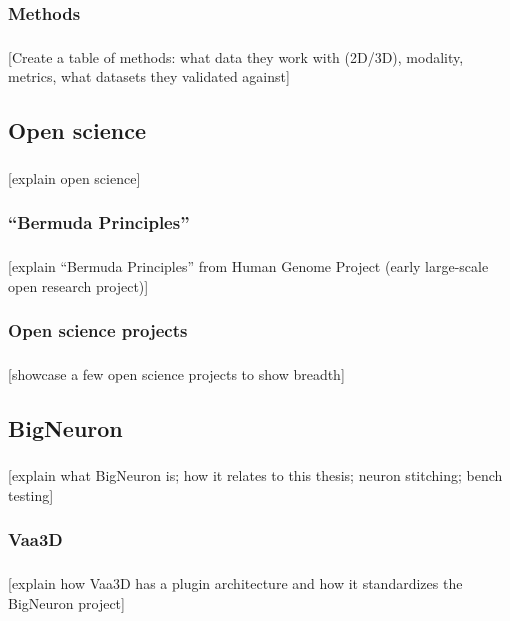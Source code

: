 \documentclass{beamer}
\newcommand{\tbackground}[1]{#1}
\newcommand{\tbackground}[1]{\textcolor{tbackground}{#1}}
\begin{document}
\subsubsection{Methods}
\begin{frame}\frametitle{\subsubsecname}
	[\tbackground{Create a table of methods: what data they work with (2D/3D), modality,
	metrics, what datasets they validated against}]
\end{frame}

\subsection{Open science}
\begin{frame}\frametitle{\subsecname}
	[\tbackground{explain open science}]
\end{frame}

\subsubsection{``Bermuda Principles''}
\begin{frame}\frametitle{\subsubsecname}
	[\tbackground{explain ``Bermuda Principles'' from Human Genome Project
	(early large-scale open research project)}]
\end{frame}

\subsubsection{Open science projects}
\begin{frame}\frametitle{\subsubsecname}
	[\tbackground{showcase a few open science projects to show breadth}]
\end{frame}

\subsection{BigNeuron}
\begin{frame}\frametitle{\subsecname}
	[\tbackground{explain what BigNeuron is; how it relates to this thesis;
		neuron stitching; bench testing}]
\end{frame}

\subsubsection{Vaa3D}
\begin{frame}\frametitle{\subsecname}
	[\tbackground{explain how Vaa3D has a plugin architecture and how it
	standardizes the BigNeuron project}]
\end{frame}
\end{document}
